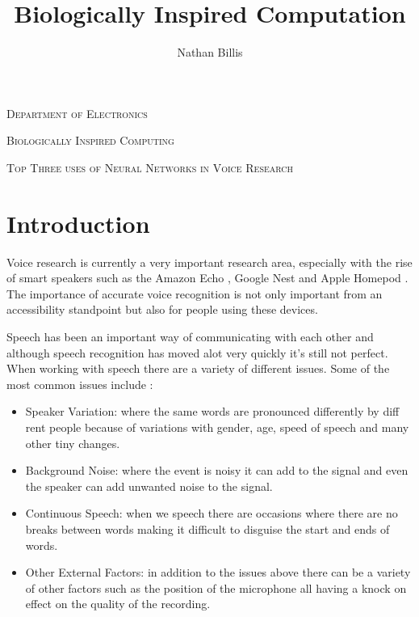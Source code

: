 \documentclass[11pt]{article}
\title{ 
    Biologically Inspired Computation
}
\author{Nathan Billis}
\begin{document}
\begin{titlepage}
    \centering
    {\scshape\LARGE Department of Electronics \par}
    \vspace{1cm}
    {\scshape\Large Biologically Inspired Computing \par}
    \vspace{1cm}
    {\scshape\Large Top Three uses of Neural Networks in Voice Research \par}
    \vfill
    {\Large\itshape \@author \par}
    \vspace{2cm}
    
    \tableofcontents

\end{titlepage}
	
\newpage

    \section{Introduction}
    
    Voice research is currently a very important research area, especially with the rise of smart speakers such as the Amazon Echo \cite{IntroducingRoom}, Google Nest \cite{GoogleStore} and Apple Homepod \cite{HomePodUK}. The importance of accurate voice recognition is not only important from an accessibility standpoint but also for people using these devices. 
    
    Speech has been an important way of communicating with each other and although speech recognition has moved alot very quickly it's still not perfect. When working with speech there are a variety of different issues. Some of the most common issues include \cite{Gevaert2010NeuralRecognition}: 
    \begin{itemize}
        \item Speaker Variation: where the same words are pronounced differently by diff rent people because of variations with gender, age, speed of speech and many other tiny changes.
        \item Background Noise: where the event is noisy it can add to the signal and even the speaker can add unwanted noise to the signal.
        \item Continuous Speech: when we speech there are occasions where there are no breaks between words making it difficult to disguise the start and ends of words.
        \item Other External Factors: in addition to the issues above there can be a variety of other factors such as the position of the microphone all having a knock on effect on the quality of the recording.
    \end{itemize}
    
\end{document}
